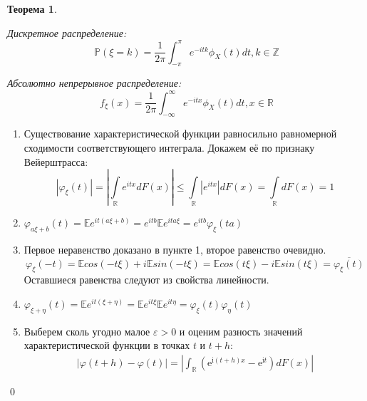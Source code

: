 \documentclass[oneside,final,14pt]{extreport}
\renewenvironment{proof}{{\bfseries Доказательство.}}{\qed}
\newtheorem{thm}{Теорема}[section]
\theoremstyle{definition}
\begin{document}
\begin{thm}
\begin{enumerate}
        Дискретное распределение:
        \begin{equation*}
            \mathbb{P}(\xi=k)=\frac{1}{2 \pi} \int_{-\pi}^{\pi} e^{-i t k} \phi_{X}(t) d t, k \in \mathbb{Z}
        \end{equation*}
        
        Абсолютно непрерывное распределение:
        \begin{equation*}
            f_{\xi}(x)=\frac{1}{2 \pi} \int_{-\infty}^{\infty} e^{-i t x} \phi_{X}(t) d t, x \in \mathbb{R}
        \end{equation*}
    \end{enumerate}
\end{thm}

\begin{proof}
    \begin{enumerate}
        \item Существование характеристической функции равносильно равномерной сходимости соответствующего интеграла. Докажем её по признаку Вейерштрасса:
        \begin{equation*}
            \left|\varphi_{\xi}(t)\right|=\left|\int\limits_{\mathbb{R}} e^{i t x} d F(x)\right| \leqslant \int\limits_{\mathbb{R}}\left|e^{i t x}\right| d F(x)=\int\limits_{\mathbb{R}} d F(x)=1
        \end{equation*}
        \item $\varphi_{a \xi+b}(t) 
        = \mathbb{E}e^{i t(a \xi+b)}
        = e^{i t b} \mathbb{E}e^{i t a \xi}
        = e^{i t b} \varphi_{\xi}(t a)$
        \item Первое неравенство доказано в пункте 1, второе равенство очевидно.
        \begin{equation*}
            \varphi_{\xi}(-t) = \mathbb{E}cos(-t \xi) + i\mathbb{E}sin(-t \xi) = \mathbb{E}cos(t \xi) - i\mathbb{E}sin(t \xi) = \overline{\varphi_{\xi}(t)}
        \end{equation*}
        Оставшиеся равенства следуют из свойства линейности.
        \item $\varphi_{\xi + \eta}(t) 
        = \mathbb{E}e^{it(\xi + \eta)} 
        = \mathbb{E}e^{it\xi}\mathbb{E}e^{it\eta}
        = \varphi_{\xi}(t)\varphi_{\eta}(t)$
        \item Выберем сколь угодно малое $\varepsilon > 0$ и оценим разность значений характеристической функции в точках $t$ и $t + h$:
        \begin{multline*}
            |\varphi(t+h)-\varphi(t)| 
            = \left|\int_{\mathbb{R}} \left(\mathrm{e}^{\mathrm{i}(t+h) x}-\mathrm{e}^{\mathrm{i} t}\right) d F(x)\right|

\end{multline*}
\end{enumerate}
\end{proof}
\end{document}
